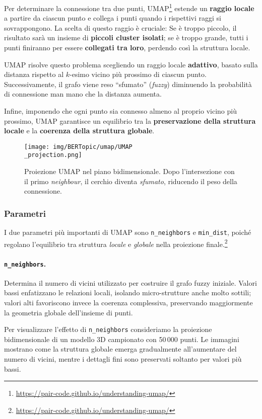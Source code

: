 Per determinare la connessione tra due punti, UMAP\footnote{\url{https://pair-code.github.io/understanding-umap/}} estende un \textbf{raggio locale} a partire da ciascun punto e collega i punti quando i rispettivi raggi si sovrappongono. La scelta di questo raggio è cruciale:
Se è troppo piccolo, il risultato sarà un insieme di \textbf{piccoli cluster isolati};
se è troppo grande, tutti i punti finiranno per essere \textbf{collegati tra loro}, perdendo così la struttura locale.

UMAP risolve questo problema scegliendo un raggio locale \textbf{adattivo}, basato sulla distanza rispetto al $k$-esimo vicino più prossimo di ciascun punto. Successivamente, il grafo viene reso ``sfumato'' (\textit{fuzzy}) diminuendo la probabilità di connessione man mano che la distanza aumenta.

Infine, imponendo che ogni punto sia connesso almeno al proprio vicino più prossimo, UMAP garantisce un equilibrio tra la \textbf{preservazione della struttura locale} e la \textbf{coerenza della struttura globale}.
\begin{figure}[H]
\centering
\texttt{[image: img/BERTopic/umap/UMAP\\\_projection.png]}
\caption{Proiezione UMAP nel piano bidimensionale. Dopo l'intersezione con il primo \emph{neighbour}, il cerchio diventa \emph{sfumato}, riducendo il peso della connessione.\protect\footnotemark}
\label{fig:umap-projection}
\end{figure}
\subsubsection{Parametri}
I due parametri più importanti di UMAP sono \texttt{n\_neighbors} e \texttt{min\_dist}, poiché regolano l'equilibrio tra struttura \textit{locale} e \textit{globale} nella proiezione finale.\footnote{\url{https://pair-code.github.io/understanding-umap/}}

\paragraph{\texttt{n\_neighbors}.} Determina il numero di vicini utilizzato per costruire il grafo fuzzy iniziale. Valori bassi enfatizzano le relazioni locali, isolando micro-strutture anche molto sottili; valori alti favoriscono invece la coerenza complessiva, preservando maggiormente la geometria globale dell'insieme di punti.

Per visualizzare l'effetto di \texttt{n\_neighbors} consideriamo la proiezione bidimensionale di un modello 3D campionato con 50\,000 punti. Le immagini mostrano come la struttura globale emerga gradualmente all'aumentare del numero di vicini, mentre i dettagli fini sono preservati soltanto per valori più bassi.

